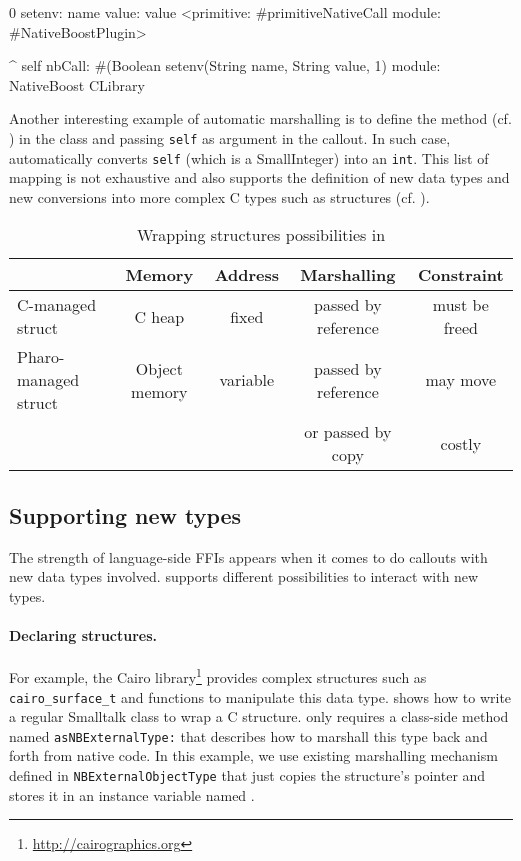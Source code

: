 \begin{stcode}[
	label={lst:setenv},
	caption={Example of callout to \ttt{setenv}}]{0}
setenv: name value: value
	<primitive: #primitiveNativeCall
	 module: #NativeBoostPlugin>

	^ self
		nbCall: #(Boolean setenv(String name,
								 String value,
								 1)
		module: NativeBoost CLibrary
\end{stcode}

Another interesting example of automatic marshalling is to define the  method (cf. ) in the  class and passing \texttt{self} as argument in the callout. In such case, \NB automatically converts \texttt{self} (which is a SmallInteger) into an \texttt{int}.
This list of mapping is not exhaustive and \NB also supports the definition of new data types and new conversions into more complex C types such as structures (cf. ).



\begin{table}[t]
    \centering
    \begin{tabular}{lcccc}
                    &  Memory 	& Address & Marshalling & Constraint  \\\midrule
C-managed struct 	&  C heap  	& fixed & passed by reference & must be freed \\
Pharo-managed struct & Object memory & variable & passed by reference & may move \\
& & & or passed by copy & costly\\
    \end{tabular}
    \caption{Wrapping structures possibilities in \NB}
\end{table}

\subsection{Supporting new types}

The strength of language-side FFIs appears when it comes to do callouts with new data types involved.
\NBFFI supports different possibilities to interact with new types.

\paragraph{Declaring structures.}
For example, the Cairo library\footnote{\url{http://cairographics.org}} provides complex structures such as \texttt{cairo\_surface\_t} and functions to manipulate this data type. %
 shows how to write a regular Smalltalk class to wrap a C structure.
\NB only requires a class-side method named \texttt{asNBExternalType:} that describes how to marshall this type back and forth from native code.
In this example, we use existing marshalling mechanism defined in \texttt{NBExternalObjectType} that just copies the structure's pointer and stores it in an instance variable named .

